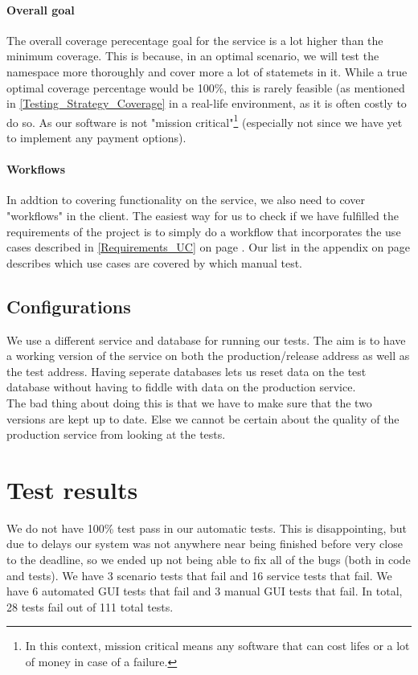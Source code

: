 \paragraph{Overall goal}
The overall coverage perecentage goal for the service is a lot higher than the minimum coverage. This is because, in an optimal scenario, we will test the  namespace more thoroughly and cover more a lot of statemets in it. While a true optimal coverage percentage would be 100\%, this is rarely feasible (as mentioned in \ref{Testing_Strategy_Coverage} in a real-life environment, as it is often costly to do so. As our software is not "mission critical"\footnote{In this context, mission critical means any software that can cost lifes or a lot of money in case of a failure.} (especially not since we have yet to implement any payment options).

\paragraph{Workflows}
\label{Testing_Strategy_Coverage_Workflows}
In addtion to covering functionality on the service, we also need to cover "workflows" in the client. The easiest way for us to check if we have fulfilled the requirements of the project is to simply do a workflow that incorporates the use cases described in \ref{Requirements_UC} on page \pageref{Requirements_UC}. Our list in the appendix on page \pageref{Appendix_Test_Manual} describes which use cases are covered by which manual test.

\subsection{Configurations}
\label{Testing_Strategy_Configurations}
We use a different service and database for running our tests. The aim is to have a working version of the service on both the production/release address as well as the test address. Having seperate databases lets us reset data on the test database without having to fiddle with data on the production service.
\\The bad thing about doing this is that we have to make sure that the two versions are kept up to date. Else we cannot be certain about the quality of the production service from looking at the tests.

\section{Test results}
\label{Testing_Results}
We do not have 100\% test pass in our automatic tests. This is disappointing, but due to delays our system was not anywhere near being finished before very close to the deadline, so we ended up not being able to fix all of the bugs (both in code and tests). We have  3 scenario tests that fail and 16 service tests that fail. We have 6 automated GUI tests that fail and 3 manual GUI tests that fail. In total, 28 tests fail out of 111 total tests.

